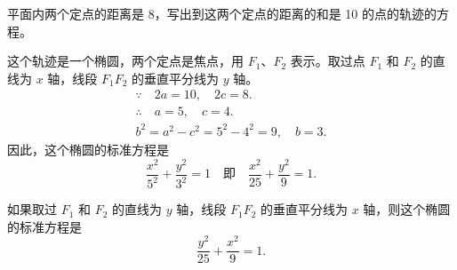 \medskip
\begin{example}
  平面内两个定点的距离是 8，写出到这两个定点的距离的和是 10 的点的轨迹的方程。
\end{example}
\begin{solution}
  这个轨迹是一个椭圆，两个定点是焦点，用 $F_1$、$F_2$ 表示。取过点 $F_1$ 和 $F_2$ 的直线为 $x$ 轴，线段 $F_1F_2$ 的垂直平分线为 $y$ 轴。
\begin{gather*}
  \because\quad  2a=10,\quad 2c=8.\\
  \therefore\quad a=5,\quad c=4.\\
  b^2=a^2-c^2=5^2-4^2=9,\quad b=3.
\end{gather*}
因此，这个椭圆的标准方程是
\[ \frac{x^2}{5^2}+\frac{y^2}{3^2}=1\quad \text{即} \quad \frac{x^2}{25}+\frac{y^2}{9}=1.\]

如果取过 $F_1$ 和 $F_2$ 的直线为 $y$ 轴，线段 $F_1F_2$ 的垂直平分线为 $x$ 轴，则这个椭圆的标准方程是
\[ \frac{y^2}{25}+\frac{x^2}{9}=1.\]
\end{solution}

